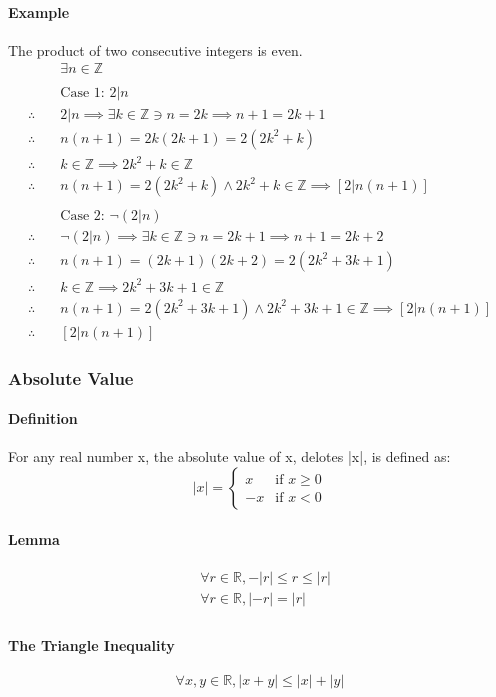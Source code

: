 \paragraph*{Example}
The product of two consecutive integers is even.
\begin{align*}
    & \exists n \in \mathbb{Z}\\
    \\
    & \text{Case 1: } 2|n\\
    \therefore \quad & 2|n \implies \exists k \in \mathbb{Z} \ni n = 2k \implies n + 1 = 2k + 1\\
    \therefore \quad & n(n+1) = 2k(2k+1) = 2(2k^2 + k)\\
    \therefore \quad & k \in \mathbb{Z} \implies 2k^2+k \in \mathbb{Z}\\
    \therefore \quad & n(n+1) = 2(2k^2 + k) \land 2k^2 + k \in \mathbb{Z} \implies [2|n(n+1)]\\
    \\
    & \text{Case 2: } \neg (2|n)\\
    \therefore \quad & \neg (2|n) \implies \exists k \in \mathbb{Z} \ni n = 2k + 1 \implies n + 1 = 2k + 2\\
    \therefore \quad & n(n+1) = (2k + 1)(2k + 2) = 2(2k^2 + 3k + 1)\\
    \therefore \quad & k \in \mathbb{Z} \implies 2k^2 + 3k + 1 \in \mathbb{Z}\\
    \therefore \quad & n(n+1) = 2(2k^2 + 3k + 1) \land 2k^2 + 3k + 1 \in \mathbb{Z} \implies [2|n(n+1)]
    \\
    \therefore \quad & [2|n(n+1)]
\end{align*}

\subsubsection*{Absolute Value}
\paragraph*{Definition}
For any real number x, the absolute value of x, delotes |x|, is defined as:
\begin{equation*}
    |x| = \begin{cases}
        x & \text{if } x \geq 0\\
        -x & \text{if } x < 0
    \end{cases}
\end{equation*}

\paragraph*{Lemma}
\begin{align*}
    & \forall r \in \mathbb{R}, -|r| \leq r \leq |r|\\
    & \forall r \in \mathbb{R}, |-r| = |r|\\
\end{align*}

\paragraph*{The Triangle Inequality}
\begin{equation*}
    \forall x,y \in \mathbb{R}, |x+y| \leq |x| + |y|
\end{equation*}